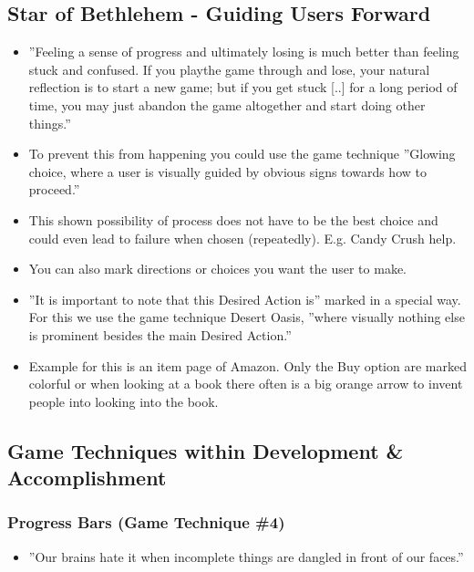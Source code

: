 \subsection{Star of Bethlehem - Guiding Users Forward}
\begin{itemize}
    \item ''Feeling a sense of progress and ultimately losing is much better than feeling stuck and confused. If you playthe game through and lose, your natural reflection is to start a new game; but if you get stuck [..] for a long period of time, you may just abandon the game altogether and start doing other things.''
    \item To prevent this from happening you could use the game technique ''Glowing choice, where a user is visually guided by obvious signs towards how to proceed.''
    \item This shown possibility of process does not have to be the best choice and could even lead to failure when chosen (repeatedly). E.g. Candy Crush help.
    \item You can also mark directions or choices you want the user to make.
    \item ''It is important to note that this Desired Action is'' marked in a special way. For this we use the game technique Desert Oasis, ''where visually nothing else is prominent besides the main Desired Action.''
    \item Example for this is an item page of Amazon. Only the Buy option are marked colorful or when looking at a book there often is a big orange arrow to invent people into looking into the book.
\end{itemize}

\subsection{Game Techniques within Development \& Accomplishment}
\subsubsection{Progress Bars (Game Technique \#4)}
\begin{itemize}
    \item ''Our brains hate it when incomplete things are dangled in front of our faces.''
\end{itemize}

